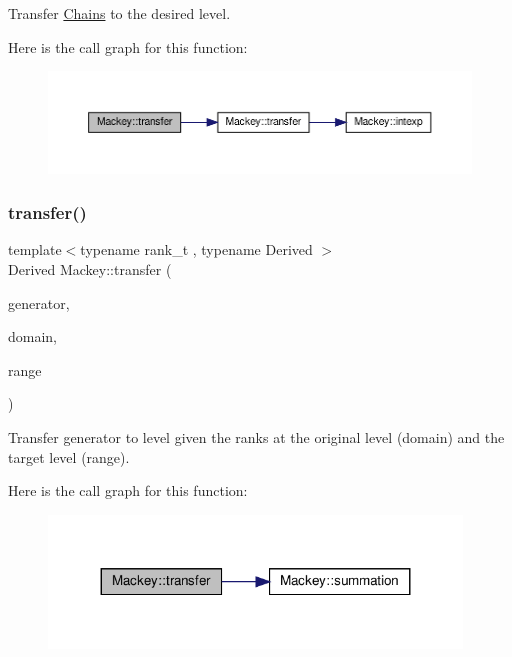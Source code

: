 Transfer \hyperlink{classMackey_1_1Chains}{Chains} to the desired level. 

Here is the call graph for this function\+:\nopagebreak
\begin{figure}[H]
\begin{center}
\leavevmode
\includegraphics[width=350pt]{namespaceMackey_a50837580391b5c6705e23c637d742b22_cgraph}
\end{center}
\end{figure}
\mbox{\label{namespaceMackey_a0550bf97e47b3c319cb5e1bd81008d89}} 
\subsubsection{\texorpdfstring{transfer()}{transfer()}\hspace{0.1cm}{\footnotesize\ttfamily [5/6]}}
{\footnotesize\ttfamily template$<$typename rank\+\_\+t , typename Derived $>$ \\
Derived Mackey\+::transfer (\begin{DoxyParamCaption}\item[{const Eigen\+::\+Matrix\+Base$<$ Derived $>$ \&}]{generator,  }\item[{const rank\+\_\+t \&}]{domain,  }\item[{const rank\+\_\+t \&}]{range }\end{DoxyParamCaption})}



Transfer generator to level given the ranks at the original level (domain) and the target level (range). 

Here is the call graph for this function\+:\nopagebreak
\begin{figure}[H]
\begin{center}
\leavevmode
\includegraphics[width=311pt]{namespaceMackey_a0550bf97e47b3c319cb5e1bd81008d89_cgraph}
\end{center}
\end{figure}
\mbox{\label{namespaceMackey_abd5b370902e8b53b32e3fd4e329f068d}} 
